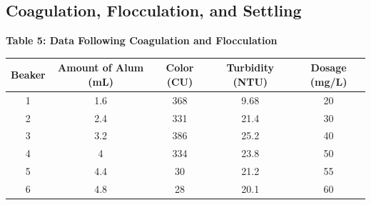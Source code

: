 \subsection{Coagulation, Flocculation, and Settling}
\begin{center}


{\large{\bf Table 5: Data Following Coagulation and Flocculation\\}}
\vspace{3 mm}
\begin{tabular}{|c c c c c|}
    \hline
    \textbf{Beaker} & \textbf{Amount of Alum (mL)} & \textbf{Color (CU)} & \textbf{Turbidity (NTU)} & \textbf{Dosage (mg/L)}\\\hline
    1 & 1.6 & 368 & 9.68 & 20 \\
    2 & 2.4 & 331 & 21.4 & 30 \\
    3 & 3.2 & 386 & 25.2 & 40 \\
    4 & 4   & 334 & 23.8 & 50 \\
    5 & 4.4 & 30  & 21.2 & 55 \\
    6 & 4.8 & 28  & 20.1 & 60 \\\hline
\end{tabular}
\vspace{6 mm}





\end{center}
